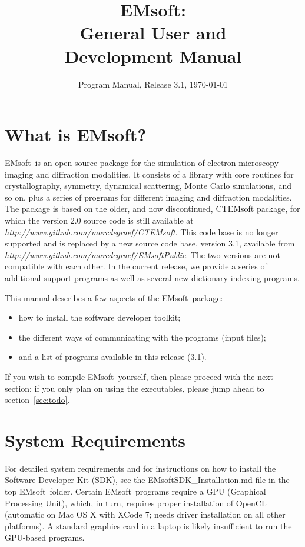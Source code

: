 \documentclass[DIV=calc, paper=letter, fontsize=11pt]{scrartcl}	 %
\title{EMsoft:\\ General User and\\ Development Manual} %
\author{\vspace*{-0.7in}} %
\date{Program Manual, Release 3.1, \today}
\newcommand{\ctp}{\textsf{EMsoft}}
\newcommand{\ctpb}{\textbf{\textsf{EMsoft}}}
\begin{document}
\maketitle

\renewcommand{\contentsname}{Table of Contents}
{\small\tableofcontents}

\newpage
\section{What is \ctpb?}
\ctp\ is an open source package for the simulation of electron microscopy imaging and diffraction modalities.  It consists of a library with
core routines for crystallography, symmetry, dynamical scattering, Monte Carlo simulations, and so on, plus a series of programs for  different imaging and diffraction modalities.
The package is based on the older, and now discontinued, \textsf{CTEMsoft} package, for which the version 2.0 source code is still
available at \textit{http://www.github.com/marcdegraef/CTEMsoft}.  This code base is no longer supported and is replaced
by a new source code base, version 3.1, available from \textit{http://www.github.com/marcdegraef/EMsoftPublic}.  The two versions are not 
compatible with each other.  In the current release, we provide a series of additional support programs as well as several new dictionary-indexing programs.

This manual describes a few aspects of the \ctp\ package:
\begin{itemize}
\item how to install the software developer toolkit;
\item the different ways of communicating with the programs (input files);
\item and a list of programs available in this release (3.1).
\end{itemize}

If you wish to compile \ctp\ yourself, then please proceed with the next section; if you only plan on using the 
executables, please jump ahead to section~\ref{sec:todo}.

\section{System Requirements\label{sec:sysreq}}
For detailed system requirements and for instructions on how to install the Software Developer Kit (SDK), see the \textsf{EMsoftSDK\_Installation.md} file in the top \ctp\ folder.
Certain \ctp\ programs require a GPU (Graphical Processing Unit), which, in turn, requires proper installation of OpenCL (automatic on Mac OS X with XCode 7; needs driver 
installation on all other platforms).  A standard graphics card in a laptop is likely insufficient to run the GPU-based programs.
\end{document}
